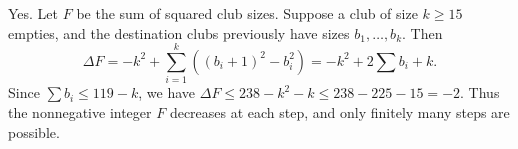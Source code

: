 Yes. Let $F$ be the sum of squared club sizes. Suppose a club of size $k\ge15$ empties, and the destination clubs previously have sizes $b_1,\ldots,b_k$. Then
\[\Delta F=-k^2+\sum_{i=1}^k((b_i+1)^2-b_i^2)=-k^2+2\sum b_i+k.\]
Since $\sum b_i\le119-k$, we have $\Delta F\le238-k^2-k\le238-225-15=-2$. Thus the nonnegative integer $F$ decreases at each step, and only finitely many steps are possible.
